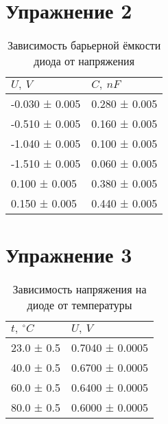 \documentclass[12pt]{article}
\begin{document}
\section*{Упражнение 2}
\indent
  
  \begin{table}[H]
  \begin{tabular}{ll}
  	\toprule
  	$U,\: V$ &          $C,\: nF$ \\
  	\midrule
  	-0.030 ± 0.005 &  0.280 ± 0.005 \\
  	-0.510 ± 0.005 &  0.160 ± 0.005 \\
  	-1.040 ± 0.005 &  0.100 ± 0.005 \\
  	-1.510 ± 0.005 &  0.060 ± 0.005 \\
  	0.100 ± 0.005 &  0.380 ± 0.005 \\
  	0.150 ± 0.005 &  0.440 ± 0.005 \\
  	\bottomrule
  \end{tabular}
\caption{Зависимость барьерной ёмкости диода от напряжения}
\end{table}

\section*{Упражнение 3}
  
  \begin{table}[H]
  \begin{tabular}{ll}
  	\toprule
  	$t,\: ^{\circ}C$ &             $U,\: V$ \\
  	\midrule
  	23.0 ± 0.5 &  0.7040 ± 0.0005 \\
  	40.0 ± 0.5 &  0.6700 ± 0.0005 \\
  	60.0 ± 0.5 &  0.6400 ± 0.0005 \\
  	80.0 ± 0.5 &  0.6000 ± 0.0005 \\
  	\bottomrule
  \end{tabular}
\caption{Зависимость напряжения на диоде от температуры}
\end{table}
\end{document}
